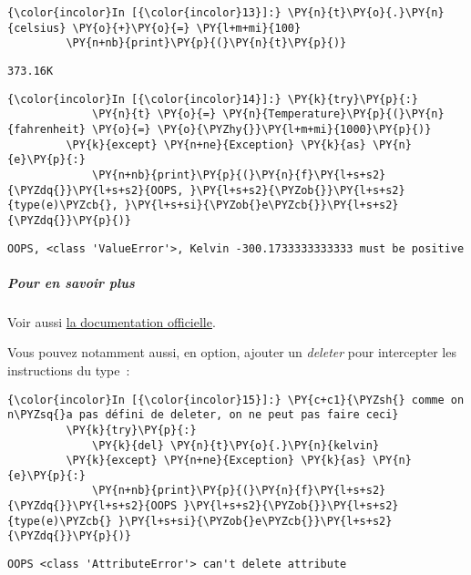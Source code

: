     \begin{Verbatim}[commandchars=\\\{\},frame=single,framerule=0.3mm,rulecolor=\color{cellframecolor}]
{\color{incolor}In [{\color{incolor}13}]:} \PY{n}{t}\PY{o}{.}\PY{n}{celsius} \PY{o}{+}\PY{o}{=} \PY{l+m+mi}{100}
         \PY{n+nb}{print}\PY{p}{(}\PY{n}{t}\PY{p}{)}
\end{Verbatim}


    \begin{Verbatim}[commandchars=\\\{\},frame=single,framerule=0.3mm,rulecolor=\color{cellframecolor}]
373.16K
\end{Verbatim}

    \begin{Verbatim}[commandchars=\\\{\},frame=single,framerule=0.3mm,rulecolor=\color{cellframecolor}]
{\color{incolor}In [{\color{incolor}14}]:} \PY{k}{try}\PY{p}{:}
             \PY{n}{t} \PY{o}{=} \PY{n}{Temperature}\PY{p}{(}\PY{n}{fahrenheit} \PY{o}{=} \PY{o}{\PYZhy{}}\PY{l+m+mi}{1000}\PY{p}{)}
         \PY{k}{except} \PY{n+ne}{Exception} \PY{k}{as} \PY{n}{e}\PY{p}{:}
             \PY{n+nb}{print}\PY{p}{(}\PY{n}{f}\PY{l+s+s2}{\PYZdq{}}\PY{l+s+s2}{OOPS, }\PY{l+s+s2}{\PYZob{}}\PY{l+s+s2}{type(e)\PYZcb{}, }\PY{l+s+si}{\PYZob{}e\PYZcb{}}\PY{l+s+s2}{\PYZdq{}}\PY{p}{)}
\end{Verbatim}


    \begin{Verbatim}[commandchars=\\\{\},frame=single,framerule=0.3mm,rulecolor=\color{cellframecolor}]
OOPS, <class 'ValueError'>, Kelvin -300.1733333333333 must be positive
\end{Verbatim}

    \hypertarget{pour-en-savoir-plus}{%
\subparagraph{Pour en savoir plus}\label{pour-en-savoir-plus}}

    Voir aussi
\href{https://docs.python.org/3.6/library/functions.html\#property}{la
documentation officielle}.

    Vous pouvez notamment aussi, en option, ajouter un \emph{deleter} pour
intercepter les instructions du type~:

    \begin{Verbatim}[commandchars=\\\{\},frame=single,framerule=0.3mm,rulecolor=\color{cellframecolor}]
{\color{incolor}In [{\color{incolor}15}]:} \PY{c+c1}{\PYZsh{} comme on n\PYZsq{}a pas défini de deleter, on ne peut pas faire ceci}
         \PY{k}{try}\PY{p}{:}
             \PY{k}{del} \PY{n}{t}\PY{o}{.}\PY{n}{kelvin}
         \PY{k}{except} \PY{n+ne}{Exception} \PY{k}{as} \PY{n}{e}\PY{p}{:}
             \PY{n+nb}{print}\PY{p}{(}\PY{n}{f}\PY{l+s+s2}{\PYZdq{}}\PY{l+s+s2}{OOPS }\PY{l+s+s2}{\PYZob{}}\PY{l+s+s2}{type(e)\PYZcb{} }\PY{l+s+si}{\PYZob{}e\PYZcb{}}\PY{l+s+s2}{\PYZdq{}}\PY{p}{)}
\end{Verbatim}


    \begin{Verbatim}[commandchars=\\\{\},frame=single,framerule=0.3mm,rulecolor=\color{cellframecolor}]
OOPS <class 'AttributeError'> can't delete attribute
\end{Verbatim}


    
    
    
